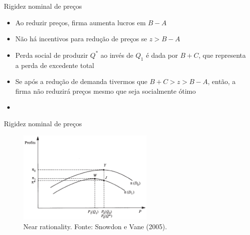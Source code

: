 \documentclass[10pt]{beamer}
\begin{document}
\begin{frame}{Rigidez nominal de preços}
    \begin{itemize}
        \item Ao reduzir preços, firma aumenta lucros em $B - A$\bigskip
        \item Não há incentivos para redução de preços se $z > B - A$\bigskip
        \item Perda social de produzir $Q^*$ ao invés de $Q_1$ é dada por $B + C$, que representa a perda de excedente total\bigskip
        \item Se após a redução de demanda tivermos que $B + C > z > B - A$, então, a firma não reduzirá preços mesmo que seja socialmente ótimo\bigskip
        \item {}
    \end{itemize}
\end{frame}

\begin{frame}{Rigidez nominal de preços}
    \begin{figure}
        \centering
        \includegraphics[width=0.6\textwidth]{./figures/aula15_fig5.PNG}
        \caption{Near rationality. Fonte: Snowdon e Vane (2005).}
        \label{aula15_fig5}
    \end{figure}
\end{frame}
\end{document}
